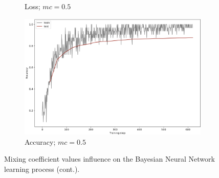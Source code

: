 \begin{figure}[]
\begin{subfigure}[b]{0.48\textwidth}
         \caption{Loss; $mc=0.5$}
     \end{subfigure}
     \hfill
     \begin{subfigure}[b]{0.48\textwidth}
         \centering
         \includegraphics[width=\textwidth]{observational/img/bnn/mc/AC_default.png}
         \caption{Accuracy; $mc=0.5$}
     \end{subfigure} 
     \caption[]{Mixing coefficient values influence on the Bayesian Neural Network learning process (cont.).}
\end{figure}
